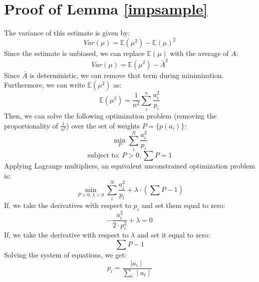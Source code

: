 \section{Proof of Lemma \ref{impsample}}\label{impsample-deriv}
The variance of this estimate is given by:
\[
Var(\mu) = \mathbb{E}(\mu^2)-\mathbb{E}(\mu)^2
\] 
Since the estimate is unbiased, we can replace $\mathbb{E}(\mu)$ with the average of $A$:
\[
Var(\mu) = \mathbb{E}(\mu^2)-\bar{A}^2
\]
Since $\bar{A}$ is deterministic, we can remove that term during minimization.
Furthermore, we can write $\mathbb{E}(\mu^2)$ as:
\[
\mathbb{E}(\mu^2) = \frac{1}{n^2}\sum_i^n \frac{a_i^2}{p_i}
\]
Then, we can solve the following optimization problem (removing the proportionality of $\frac{1}{n^2}$) over the set of weights $P=\{p(a_i)\}$:
\[
\min_{P} \sum_i^N \frac{a_i^2}{p_i}
\]
\[
\text{subject to: } P > 0, \sum P = 1
\]
Applying Lagrange multipliers, an equivalent unconstrained optimization problem is:
\[
\min_{P > 0,\lambda > 0} \sum_i^N \frac{a_i^2}{p_i} + \lambda \cdot (\sum P - 1)
\]
If, we take the derivatives with respect to $p_i$ and set them equal to zero:
\[
-\frac{a_i^2}{2 \cdot p_i^2} + \lambda = 0
\]
If, we take the derivative with respect to $\lambda$ and set it equal to zero:
\[
\sum P - 1
\]
Solving the system of equations, we get:
\[
p_i = \frac{\mid a_i \mid }{\sum_i \mid a_i \mid}
\]

